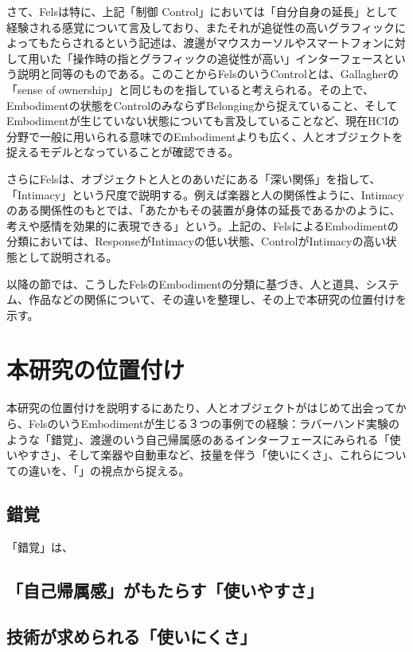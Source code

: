 さて、Felsは特に、上記「制御 Control」においては「自分自身の延長」として経験される感覚について言及しており、またそれが追従性の高いグラフィックによってもたらされるという記述は、渡邊がマウスカーソルやスマートフォンに対して用いた「操作時の指とグラフィックの追従性が高い」インターフェースという説明と同等のものである。このことからFelsのいうControlとは、Gallagherの「sense of ownership」と同じものを指していると考えられる。その上で、Embodimentの状態をControlのみならずBelongingから捉えていること、そしてEmbodimentが生じていない状態についても言及していることなど、現在HCIの分野で一般に用いられる意味でのEmbodimentよりも広く、人とオブジェクトを捉えるモデルとなっていることが確認できる。

さらにFelsは、オブジェクトと人とのあいだにある「深い関係」を指して、「Intimacy」という尺度で説明する。例えば楽器と人の関係性ように、Intimacyのある関係性のもとでは、「あたかもその装置が身体の延長であるかのように、考えや感情を効果的に表現できる」という。上記の、FelsによるEmbodimentの分類においては、ResponseがIntimacyの低い状態、ControlがIntimacyの高い状態として説明される。

以降の節では、こうしたFelsのEmbodimentの分類に基づき、人と道具、システム、作品などの関係について、その違いを整理し、その上で本研究の位置付けを示す。

\section{本研究の位置付け}
本研究の位置付けを説明するにあたり、人とオブジェクトがはじめて出会ってから、FelsのいうEmbodimentが生じる３つの事例での経験：ラバーハンド実験のような「錯覚」、渡邊のいう自己帰属感のあるインターフェースにみられる「使いやすさ」、そして楽器や自動車など、技量を伴う「使いにくさ」、これらについての違いを、「」の視点から捉える。

\subsection*{錯覚}
「錯覚」は、
\subsection*{「自己帰属感」がもたらす「使いやすさ」}
\subsection*{技術が求められる「使いにくさ」}

